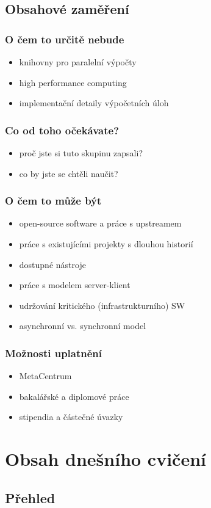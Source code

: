 \subsection{Obsahové zaměření}

\begin{frame}
	\frametitle{O čem to určitě nebude}
	\begin{itemize}
		\item{knihovny pro paralelní výpočty}
		\item{high performance computing}
		\item{implementační detaily výpočetních úloh}
	\end{itemize}
\end{frame}

\begin{frame}
	\frametitle{Co od toho očekávate?}
	\begin{itemize}
		\item{proč jste si tuto skupinu zapsali?}
		\item{co by jste se chtěli naučit?}
	\end{itemize}
\end{frame}

\begin{frame}
	\frametitle{O čem to může být}
	\begin{itemize}
		\item{open-source software a práce s upstreamem}
		\item{práce s existujícími projekty s dlouhou historií}
		\item{dostupné nástroje}
		\item{práce s modelem server-klient}
		\item{udržování kritického (infrastrukturního) SW}
		\item{asynchronní vs. synchronní model}
	\end{itemize}
\end{frame}

\begin{frame}
	\frametitle{Možnosti uplatnění}
	\begin{itemize}
		\item{MetaCentrum}
		\item{bakalářské a diplomové práce}
		\item{stipendia a částečné úvazky}
	\end{itemize}
\end{frame}

\section{Obsah dnešního cvičení}
\subsection{Přehled}

\begin{frame}
	\frametitle{}
\end{frame}







